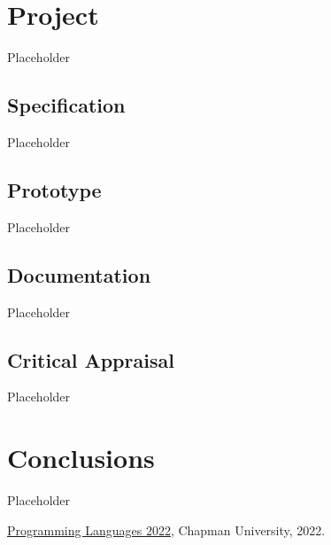\documentclass{article}
\theoremstyle{theorem}
\theoremstyle{definition}
\theoremstyle{remark}
\begin{document}
\section{Project}

Placeholder

\subsection{Specification}

Placeholder

\subsection{Prototype}

Placeholder

\subsection{Documentation}

Placeholder

\subsection{Critical Appraisal}

Placeholder

\section{Conclusions}\label{conclusions}

Placeholder

\begin{thebibliography}{99}
 \href{https://github.com/alexhkurz/programming-languages-2022/blob/main/README.md}{Programming Languages 2022}, Chapman University, 2022.
\end{thebibliography}
\end{document}
